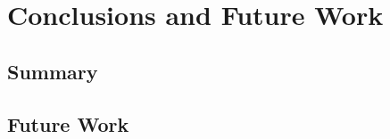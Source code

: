 \chapter{Conclusions and Future Work}
\label{chapter:conclusions}

\section{Summary}
\label{sec:conclusions-summary}

\section{Future Work}
\label{sec:future}
